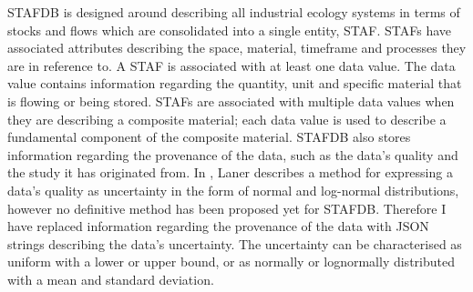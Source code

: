 \documentclass[ %
                    author={Tom Jager},
                supervisor={Dr. Daniel Schien},
                    degree={MEng},
                     title={A Bayesian Inference Engine for UMIS Structured Data},
                  subtitle={},
                      type={research},
                      year={2019} ]{dissertation}
\begin{document}
STAFDB is designed around describing all industrial ecology systems in terms of stocks and flows which are consolidated into a single entity, STAF. STAFs have associated attributes describing the space, material, timeframe and processes they are in reference to. A STAF is associated with at least one data value. The data value contains information regarding the quantity, unit and specific material that is flowing or being stored. STAFs are associated with multiple data values when they are describing a composite material; each data value is used to describe a fundamental component of the composite material. STAFDB also stores information regarding the provenance of the data, such as the data's quality and the study it has originated from. In \cite{laner2014systematic}, Laner describes a method for expressing a data's quality as uncertainty in the form of normal and log-normal distributions, however no definitive method has been proposed yet for STAFDB. Therefore I have replaced information regarding the provenance of the data with JSON strings describing the data's uncertainty. The uncertainty can be characterised as uniform with a lower or upper bound, or as normally or lognormally distributed with a mean and standard deviation.
\end{document}
